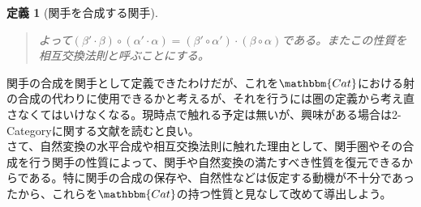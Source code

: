 \documentclass[uplatex,dvipdfmx]{jsarticle}
\newcommand{\cat}[1]{\mathbbm{#1}}
\newtheorem{define}[proof]{定義}
\numberwithin{proof}{subsection}
\newenvironment{mydescription}
{\begin{description}
  \setlength{\parskip}{0.5cm}
}
{\end{description}}
\begin{document}
\begin{define}[関手を合成する関手]
\begin{quote}
\begin{mydescription}
\begin{center}
\begin{tikzpicture}[auto]
      \end{tikzpicture}
    \end{center}
    よって$(\beta'\cdot\beta)\circ(\alpha'\cdot\alpha)=(\beta'\circ\alpha')\cdot(\beta\circ\alpha)$である。またこの性質を相互交換法則と呼ぶことにする。
		\end{mydescription}
		\end{quote}
  \end{define}
  関手の合成を関手として定義できたわけだが、これを$\cat{Cat}$における射の合成の代わりに使用できるかと考えるが、それを行うには圏の定義から考え直さなくてはいけなくなる。現時点で触れる予定は無いが、興味がある場合は2-Categoryに関する文献を読むと良い。\\
  さて、自然変換の水平合成や相互交換法則に触れた理由として、関手圏やその合成を行う関手の性質によって、関手や自然変換の満たすべき性質を復元できるからである。特に関手の合成の保存や、自然性などは仮定する動機が不十分であったから、これらを$\cat{Cat}$の持つ性質と見なして改めて導出しよう。\\
\end{document}
